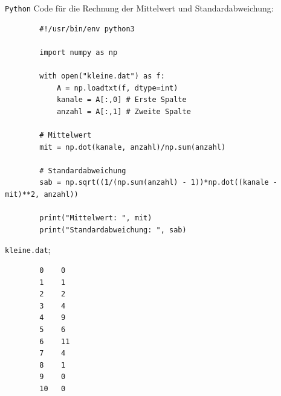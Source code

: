 \documentclass[twoside]{article}
\begin{document}
    \texttt{Python} Code für die Rechnung der Mittelwert und Standardabweichung:
    \begin{verbatim}
        #!/usr/bin/env python3

        import numpy as np
        
        with open("kleine.dat") as f:
        	A = np.loadtxt(f, dtype=int)
        	kanale = A[:,0] # Erste Spalte
        	anzahl = A[:,1] # Zweite Spalte
        
        # Mittelwert
        mit = np.dot(kanale, anzahl)/np.sum(anzahl)
        
        # Standardabweichung
        sab = np.sqrt((1/(np.sum(anzahl) - 1))*np.dot((kanale - mit)**2, anzahl))
        
        print("Mittelwert: ", mit)
        print("Standardabweichung: ", sab)
    \end{verbatim}

    \texttt{kleine.dat};
    \begin{verbatim}
        0    0
        1    1
        2    2
        3    4
        4    9
        5    6
        6    11
        7    4
        8    1
        9    0
        10   0
    \end{verbatim}
\end{document}
